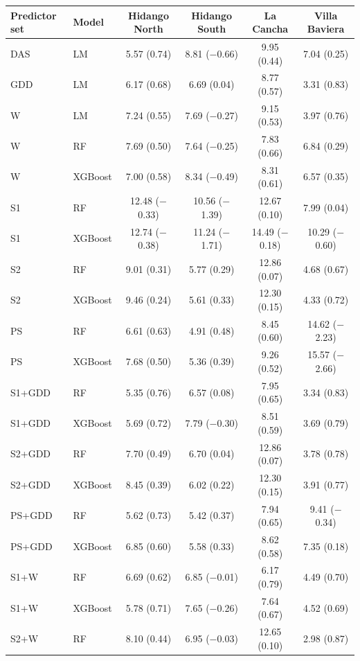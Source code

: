 \documentclass[
  english,
  review,
  number,
  sort,compress,
  authoryear,
  3p]{elsarticle}
\begin{document}
\begin{table}[htbp]
\centering
\footnotesize
\begin{tabular}{l l c c c c}
\toprule
\textbf{Predictor set} & \textbf{Model} & \textbf{Hidango North} & \textbf{Hidango South} & \textbf{La Cancha} & \textbf{Villa Baviera} \\
\midrule
DAS & LM & 5.57 (0.74) & 8.81 ($-$0.66) & 9.95 (0.44) & 7.04 (0.25) \\
GDD & LM & 6.17 (0.68) & 6.69 (0.04) & 8.77 (0.57) & 3.31 (0.83) \\
W & LM & 7.24 (0.55) & 7.69 ($-$0.27) & 9.15 (0.53) & 3.97 (0.76) \\
W & RF & 7.69 (0.50) & 7.64 ($-$0.25) & 7.83 (0.66) & 6.84 (0.29) \\
W & XGBoost & 7.00 (0.58) & 8.34 ($-$0.49) & 8.31 (0.61) & 6.57 (0.35) \\
S1 & RF & 12.48 ($-$0.33) & 10.56 ($-$1.39) & 12.67 (0.10) & 7.99 (0.04) \\
S1 & XGBoost & 12.74 ($-$0.38) & 11.24 ($-$1.71) & 14.49 ($-$0.18) & 10.29 ($-$0.60) \\
S2 & RF & 9.01 (0.31) & 5.77 (0.29) & 12.86 (0.07) & 4.68 (0.67) \\
S2 & XGBoost & 9.46 (0.24) & 5.61 (0.33) & 12.30 (0.15) & 4.33 (0.72) \\
PS & RF & 6.61 (0.63) & 4.91 (0.48) & 8.45 (0.60) & 14.62 ($-$2.23) \\
PS & XGBoost & 7.68 (0.50) & 5.36 (0.39) & 9.26 (0.52) & 15.57 ($-$2.66) \\
S1+GDD & RF & 5.35 (0.76) & 6.57 (0.08) & 7.95 (0.65) & 3.34 (0.83) \\
S1+GDD & XGBoost & 5.69 (0.72) & 7.79 ($-$0.30) & 8.51 (0.59) & 3.69 (0.79) \\
S2+GDD & RF & 7.70 (0.49) & 6.70 (0.04) & 12.86 (0.07) & 3.78 (0.78) \\
S2+GDD & XGBoost & 8.45 (0.39) & 6.02 (0.22) & 12.30 (0.15) & 3.91 (0.77) \\
PS+GDD & RF & 5.62 (0.73) & 5.42 (0.37) & 7.94 (0.65) & 9.41 ($-$0.34) \\
PS+GDD & XGBoost & 6.85 (0.60) & 5.58 (0.33) & 8.62 (0.58) & 7.35 (0.18) \\
S1+W & RF & 6.69 (0.62) & 6.85 ($-$0.01) & 6.17 (0.79) & 4.49 (0.70) \\
S1+W & XGBoost & 5.78 (0.71) & 7.65 ($-$0.26) & 7.64 (0.67) & 4.52 (0.69) \\
S2+W & RF & 8.10 (0.44) & 6.95 ($-$0.03) & 12.65 (0.10) & 2.98 (0.87) \\

\end{tabular}
\end{table}
\end{document}

